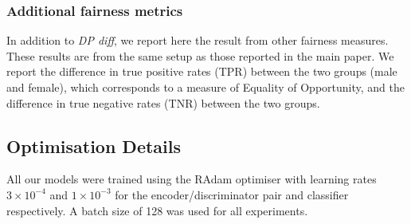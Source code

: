 \subsubsection{Additional fairness metrics}\label{ssec:additional-fair-metr}
\begin{table}[]
    \caption{
        Additional fairness metrics for the experiments on the CelebA dataset (Fig. 5 from the main text).
        \emph{TPR diff.} refers to the difference in true positive rate.
        \emph{TNR diff.} refers to the difference in true negative rate.
        \textbf{Left:} $\eta = 0$. \textbf{Right:} $\eta=1$.
    }
    \label{tab:my_label}
\hfill
{}
\end{table}
\noindent In addition to \emph{DP diff}, we report here the result from other fairness measures.
These results are from the same setup as those reported in the main paper.
We report the difference in true positive rates (TPR) between the two groups (male and female), which corresponds to a measure of Equality of Opportunity,
and the difference in true negative rates (TNR) between the two groups.

\subsection{Optimisation Details}\label{sec:optimisation-details}
\noindent All our models were trained using the RAdam optimiser \cite{liu2019variance} with learning rates $3\times10^{-4}$ and $1\times10^{-3}$ for the encoder/discriminator pair and classifier respectively. A batch size of 128 was used for all experiments.

